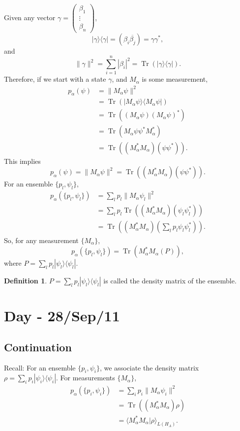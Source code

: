 \documentclass[12pt]{article}
\theoremstyle{definition}
\newtheorem*{definition}{Definition}
\newcommand{\ketbra}[2]{|#1\rangle\langle #2|}
\DeclareMathOperator{\Tr}{Tr}
\begin{document}
Given any vector $\gamma = \begin{pmatrix}\beta_1\\\vdots\\\beta_n\end{pmatrix}$,
\[
\ketbra{\gamma}{\gamma} = (\beta_i\overline{\beta_j}) = \gamma\gamma^*,
\]
and
\[
\|\gamma\|^2 = \sum_{i=1}^n |\beta_i|^2 = \Tr(\ketbra{\gamma}{\gamma}).
\]
Therefore, if we start with a state $\gamma$, and $M_\alpha$ is some measurement,
\begin{align*}
p_\alpha(\psi) &= \|M_\alpha\psi\|^2 \\
&= \Tr(\ketbra{M_\alpha\psi}{M_\alpha\psi}) \\
&= \Tr((M_\alpha\psi)(M_\alpha\psi)^*) \\
&= \Tr(M_\alpha \psi\psi^* M_\alpha^*) \\
&= \Tr((M_\alpha^*M_\alpha)(\psi\psi^*)).
\end{align*}
This implies
\[
p_\alpha(\psi) = \|M_\alpha\psi\|^2 = \Tr((M_\alpha^*M_\alpha)(\psi\psi^*)).
\]
For an ensemble $\{p_l,\psi_l\}$,
\begin{align*}
p_\alpha(\{p_l,\psi_l\}) &= \sum_l p_l \|M_\alpha\psi_l\|^2 \\
&= \sum_l p_l \Tr((M_\alpha^*M_\alpha)(\psi_l\psi_l^*)) \\
&= \Tr\left((M_\alpha^*M_\alpha)\left(\sum_l p_l \psi_l\psi_l^*\right)\right).
\end{align*}
So, for any measurement $\{M_\alpha\}$,
\[
p_\alpha(\{p_l,\psi_l\}) = \Tr(M_\alpha^*M_\alpha(P)),
\]
where $P = \sum_l p_l \ketbra{\psi_l}{\psi_l}$.

\begin{definition}
$P = \sum_l p_l \ketbra{\psi_l}{\psi_l}$ is called the density matrix of the ensemble.
\end{definition}

\section{Day - 28/Sep/11}

\subsection{Continuation}

Recall: For an ensemble $\{p_i,\psi_i\}$, we associate the density matrix $\rho = \sum_i p_i \ketbra{\psi_i}{\psi_i}$.
For measurements $\{M_\alpha\}$,
\begin{align*}
p_\alpha(\{p_i,\psi_i\}) &= \sum_i p_i \|M_\alpha \psi_i\|^2 \\
&= \Tr((M_\alpha^*M_\alpha)\rho) \\
&= \langle M_\alpha^*M_\alpha|\rho\rangle_{L(H_A)}.
\end{align*}
\end{document}
